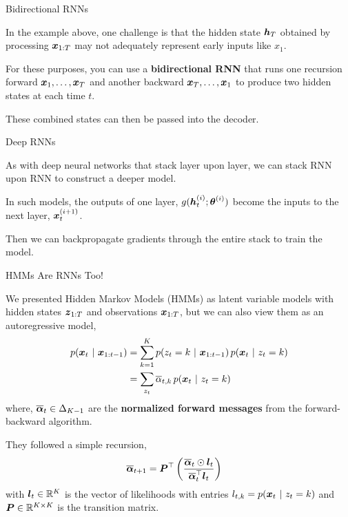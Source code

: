 \documentclass[aspectratio=169]{beamer}
\begin{document}
\begin{frame}[t,allowframebreaks]{Bidirectional RNNs}\label{bidirectional-rnns}

In the example above, one challenge is that the hidden state \(\boldsymbol{h}_T\)
obtained by processing \(\boldsymbol{x}_{1:T}\) may not adequately represent early
inputs like \(x_1\). 

For these purposes, you can use a
\textbf{bidirectional RNN} that runs one recursion forward
\(\boldsymbol{x}_1, \ldots, \boldsymbol{x}_T\) and another backward
\(\boldsymbol{x}_T, \ldots, \boldsymbol{x}_1\) to produce two hidden states at each time
\(t\). 

These combined states can then be passed into the decoder.
\end{frame}

\begin{frame}[t,allowframebreaks]{Deep RNNs}\label{deep-rnns}

As with deep neural networks that stack layer upon layer, we can stack
RNN upon RNN to construct a deeper model. 

In such models, the outputs of
one layer, \(g(\boldsymbol{h}_t^{(i)}; \boldsymbol{\theta}^{(i)})\) become the inputs to the
next layer, \(\boldsymbol{x}_t^{(i+1)}\). 

Then we can backpropagate gradients
through the entire stack to train the model.
\end{frame}

\begin{frame}[t,allowframebreaks]{HMMs Are RNNs Too!}\label{hmms-are-rnns-too}

We presented
Hidden Markov Models (HMMs) as latent variable models with hidden states
\(\boldsymbol{z}_{1:T}\) and observations \(\boldsymbol{x}_{1:T}\),
but we can also view them as an autoregressive model,
\begin{align*}
p(\boldsymbol{x}_t ~\vert~ \boldsymbol{x}_{1:t-1}) 
&= \sum_{k=1}^K p(z_t=k ~\vert~ \boldsymbol{x}_{1:t-1}) \, p(\boldsymbol{x}_t ~\vert~ z_t=k) \\
&= \sum_{z_t} \overline{\alpha}_{t,k} \, p(\boldsymbol{x}_t ~\vert~ z_t=k)
\end{align*} 
where, \(\overline{\boldsymbol{\alpha}}_t \in \Delta_{K-1}\) are the
\textbf{normalized forward messages} from the forward-backward
algorithm. 

They followed a simple recursion, 
\begin{align*}
\overline{\boldsymbol{\alpha}}_{t+1} &= \boldsymbol{P}^\top \left( \frac{\overline{\boldsymbol{\alpha}}_t \odot \boldsymbol{l}_t}{\overline{\boldsymbol{\alpha}}_t^\top \boldsymbol{l}_t} \right)
\end{align*} 
with \(\boldsymbol{l}_t \in \mathbb{R}^K\) is the vector of likelihoods
with entries \(l_{t,k} = p(\boldsymbol{x}_t ~\vert~ z_t=k)\) and
\(\boldsymbol{P} \in \mathbb{R}^{K \times K}\) is the transition matrix.
\end{frame}
\end{document}
